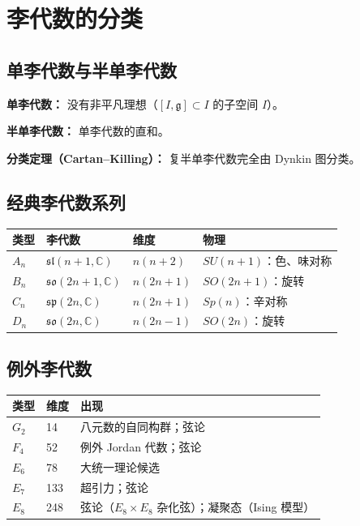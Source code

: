 \section{李代数的分类}

\subsection{单李代数与半单李代数}

\textbf{单李代数：} 没有非平凡理想（$[I, \mathfrak{g}] \subset I$ 的子空间 $I$）。

\textbf{半单李代数：} 单李代数的直和。

\textbf{分类定理（Cartan--Killing）：} 复半单李代数完全由 Dynkin 图分类。

\subsection{经典李代数系列}

\begin{center}
\begin{tabular}{L{2cm}L{3cm}L{2cm}L{5cm}}
\toprule
\textbf{类型} & \textbf{李代数} & \textbf{维度} & \textbf{物理} \\
\midrule
$A_n$ & $\mathfrak{sl}(n+1, \mathbb{C})$ & $n(n+2)$ & $SU(n+1)$：色、味对称 \\
$B_n$ & $\mathfrak{so}(2n+1, \mathbb{C})$ & $n(2n+1)$ & $SO(2n+1)$：旋转 \\
$C_n$ & $\mathfrak{sp}(2n, \mathbb{C})$ & $n(2n+1)$ & $Sp(n)$：辛对称 \\
$D_n$ & $\mathfrak{so}(2n, \mathbb{C})$ & $n(2n-1)$ & $SO(2n)$：旋转 \\
\bottomrule
\end{tabular}
\end{center}

\subsection{例外李代数}

\begin{center}
\begin{tabular}{L{2cm}L{2cm}L{6cm}}
\toprule
\textbf{类型} & \textbf{维度} & \textbf{出现} \\
\midrule
$G_2$ & 14 & 八元数的自同构群；弦论 \\
$F_4$ & 52 & 例外 Jordan 代数；弦论 \\
$E_6$ & 78 & 大统一理论候选 \\
$E_7$ & 133 & 超引力；弦论 \\
$E_8$ & 248 & 弦论（$E_8 \times E_8$ 杂化弦）；凝聚态（Ising 模型） \\
\bottomrule
\end{tabular}
\end{center}

